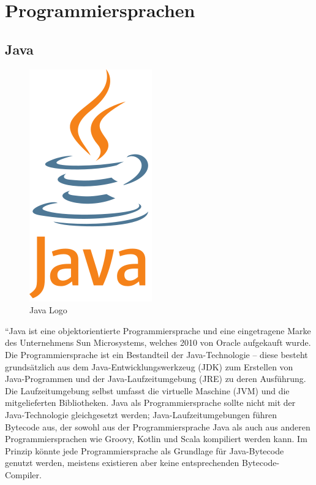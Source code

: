 \section{Programmiersprachen}

\subsection{Java}

\begin{figure}[hbt!]
    \centering
    \includegraphics[scale=0.5]{pics/java.png}
    \caption{Java Logo\cite{java}}
    \label{fig:impl:java}
\end{figure}

``Java ist eine objektorientierte Programmiersprache und eine eingetragene Marke des Unternehmens Sun Microsystems, welches 2010 von Oracle aufgekauft wurde. Die Programmiersprache ist ein Bestandteil der Java-Technologie – diese besteht grundsätzlich aus dem Java-Entwicklungswerkzeug (JDK) zum Erstellen von Java-Programmen und der Java-Laufzeitumgebung (JRE) zu deren Ausführung. Die Laufzeitumgebung selbst umfasst die virtuelle Maschine (JVM) und die mitgelieferten Bibliotheken. Java als Programmiersprache sollte nicht mit der Java-Technologie gleichgesetzt werden; Java-Laufzeitumgebungen führen Bytecode aus, der sowohl aus der Programmiersprache Java als auch aus anderen Programmiersprachen wie Groovy, Kotlin und Scala kompiliert werden kann. Im Prinzip könnte jede Programmiersprache als Grundlage für Java-Bytecode genutzt werden, meistens existieren aber keine entsprechenden Bytecode-Compiler.

